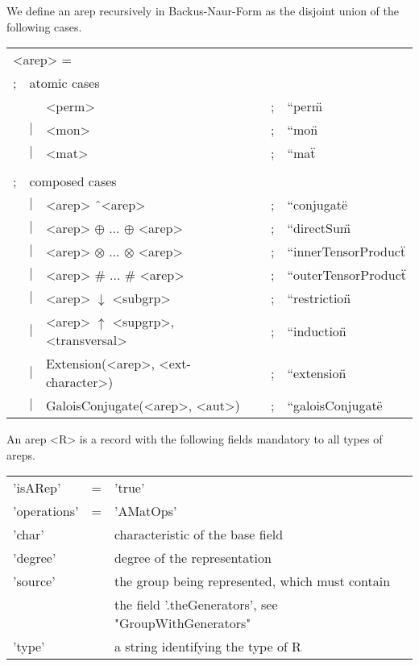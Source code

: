 We define an arep recursively in Backus-Naur-Form 
as the disjoint union of the following cases.

\begin{tabular}{lllll}
\multicolumn{5}{l}{<arep> \:\:= }\\
 ;  &\multicolumn{4}{l}{atomic cases} \\
 &   & <perm> & ; & ``perm\"\\
 & $\mid$ & <mon>  & ; & ``mon\"\\
 & $\mid$ & <mat>  & ; & ``mat\"\\
\\
 ; &\multicolumn{4}{l}{composed cases}\\
 & $\mid$ & <arep> \^\ <arep>                    & ; & ``conjugate\"\\
 & $\mid$ & <arep> $\oplus$ ... $\oplus$ <arep>  & ; & ``directSum\"\\
 & $\mid$ & <arep> $\otimes$ ... $\otimes$ <arep>& ; & ``innerTensorProduct\"\\
 & $\mid$ & <arep> $\#$ ... $\#$ <arep>          & ; & ``outerTensorProduct\"\\
 & $\mid$ & <arep> $\downarrow$ <subgrp>         & ; & ``restriction\"\\
 & $\mid$ & <arep> $\uparrow$ <supgrp>, <transversal> & ; & ``induction\"\\
 & $\mid$ & Extension(<arep>, <ext-character>)   & ; & ``extension\"\\
 & $\mid$ & GaloisConjugate(<arep>, <aut>)       & ; & ``galoisConjugate\"
\end{tabular} 

\bigskip
An arep <R> is a record with the following fields mandatory
to all types of areps.

\bigskip
\begin{center}
\begin{tabular}{lll}
'isARep'     & \:= & 'true'\\
'operations' & \:= & 'AMatOps'\\
'char'       & \: & characteristic of the base field\\
'degree'     & \: & degree of the representation\\
'source'     & \: & the group being represented, which must contain\\
             &    & the field '.theGenerators', see "GroupWithGenerators"\\
'type'       & \: & a string identifying the type of R
\end{tabular}    
\end{center}

